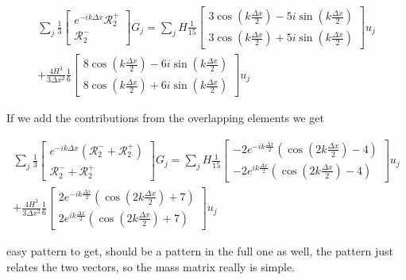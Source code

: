 \documentclass[12pt]{article}
\begin{document}
\begin{multline}
\sum _j\frac{1}{3} \begin{bmatrix} e^{-ik\Delta x}\mathcal{R}^+_2 \\\mathcal{R}^-_2  \end{bmatrix} G_j=  \sum_j H \frac{1}{15}  \begin{bmatrix} 3\cos\left(k \frac{\Delta x}{2}\right) - 5i \sin\left(k \frac{\Delta x}{2}\right) \\3\cos\left(k \frac{\Delta x}{2}\right) + 5i \sin\left(k \frac{\Delta x}{2}\right)  \end{bmatrix} u_j  \\+ \frac{4H^3}{3\Delta x^2} \frac{1}{6} \begin{bmatrix} 8 \cos\left(k \frac{\Delta x}{2}\right) - 6i \sin\left(k \frac{\Delta x}{2}\right)  \\8 \cos\left(k \frac{\Delta x}{2}\right) + 6i \sin\left(k \frac{\Delta x}{2}\right)   \end{bmatrix} u_j
\end{multline}

If we add the contributions from the overlapping elements we get

\begin{multline}
\sum _j\frac{1}{3} \begin{bmatrix} e^{-ik\Delta x}\left(\mathcal{R}^-_2 + \mathcal{R}^+_2\right) \\\mathcal{R}^-_2 + \mathcal{R}^+_2   \end{bmatrix} G_j=  \sum_j H \frac{1}{15}  \begin{bmatrix} -2e^{-ik\frac{\Delta x}{2}} \left(\cos\left(2k\frac{\Delta x}{2}\right) - 4\right)\\- 2e^{ik\frac{\Delta x}{2}} \left(\cos\left(2k\frac{\Delta x}{2}\right) - 4\right) \end{bmatrix} u_j  \\+ \frac{4H^3}{3\Delta x^2} \frac{1}{6} \begin{bmatrix}2e^{-ik\frac{\Delta x}{2}} \left(\cos\left(2k\frac{\Delta x}{2}\right) + 7\right)   \\ 2e^{ik\frac{\Delta x}{2}} \left(\cos\left(2k\frac{\Delta x}{2}\right) + 7\right)   \end{bmatrix} u_j
\end{multline}

easy pattern to get, should be a pattern in the full one as well, the pattern just relates the two vectors, so the mass matrix really is simple.
\end{document}
